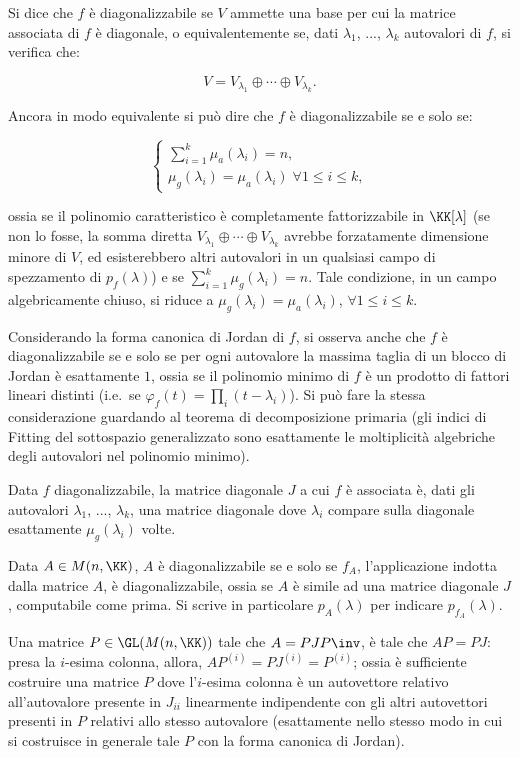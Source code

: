 \documentclass[10pt,landscape]{article}
\begin{document}
\begin{multicols}{3}
		Si dice che $f$ è diagonalizzabile se $V$ ammette una base per cui
		la matrice associata di $f$ è diagonale, o equivalentemente se,
		dati $\lambda_1$, ..., $\lambda_k$ autovalori di $f$, si verifica
		che:
		
		\[ V = V_{\lambda_1} \oplus \cdots \oplus V_{\lambda_k}. \]
		
		Ancora in modo equivalente si può dire che $f$ è diagonalizzabile
		se e solo se:
		
		\[ \begin{cases} \sum_{i=1}^k \mu_a(\lambda_i) = n, \\ \mu_g(\lambda_i) = \mu_a(\lambda_i) \; \forall 1 \leq i \leq k, \end{cases} \]
		
		ossia se il polinomio caratteristico è completamente fattorizzabile
		in $\KK[\lambda]$ (se non lo fosse, la somma diretta
		$V_{\lambda_1} \oplus \cdots \oplus V_{\lambda_k}$ avrebbe
		forzatamente dimensione minore di $V$, ed esisterebbero altri
		autovalori in un qualsiasi campo di spezzamento di $p_f(\lambda)$) e se $\sum_{i=1}^k \mu_g(\lambda_i) = n$. Tale condizione, in un
		campo algebricamente chiuso, si riduce a $\mu_g(\lambda_i) = \mu_a(\lambda_i)$, $\forall 1 \leq i \leq k$.
		
		Considerando la forma canonica di Jordan di $f$, si osserva anche
		che $f$ è diagonalizzabile se e solo se per ogni autovalore la
		massima taglia di un blocco di Jordan è esattamente $1$, ossia
		se il polinomio minimo di $f$ è un prodotto di fattori lineari
		distinti (i.e.~se $\varphi_f(t) = \prod_i (t-\lambda_i)$). Si può fare la stessa considerazione guardando al
		teorema di decomposizione primaria (gli indici di Fitting del
		sottospazio generalizzato sono esattamente le moltiplicità algebriche
		degli autovalori nel polinomio minimo).
		
		Data $f$ diagonalizzabile, la matrice diagonale $J$ a cui $f$ è
		associata è, dati gli autovalori $\lambda_1$, ..., $\lambda_k$,
		una matrice diagonale dove $\lambda_i$ compare sulla diagonale
		esattamente $\mu_g(\lambda_i)$ volte.
		
		Data $A \in M(n, \KK)$, $A$ è diagonalizzabile se e solo se $f_A$,
		l'applicazione indotta dalla matrice $A$, è diagonalizzabile,
		ossia se $A$ è simile ad una matrice diagonale $J$, computabile
		come prima. Si scrive in particolare $p_A(\lambda)$ per indicare
		$p_{f_A}(\lambda)$.
		
		Una matrice $P \in \GL(M(n, \KK))$
		tale che $A = P J P\inv$, è tale che $AP = PJ$: presa la $i$-esima
		colonna, allora, $AP^{(i)} = PJ^{(i)} = P^{(i)}$; ossia è sufficiente
		costruire una matrice $P$ dove l'$i$-esima colonna è un autovettore
		relativo all'autovalore presente in $J_{ii}$ linearmente indipendente
		con gli altri autovettori presenti in $P$ relativi allo stesso
		autovalore (esattamente nello stesso modo in cui si costruisce in
		generale tale $P$ con la forma canonica di Jordan).
		

\end{multicols}
\end{document}
